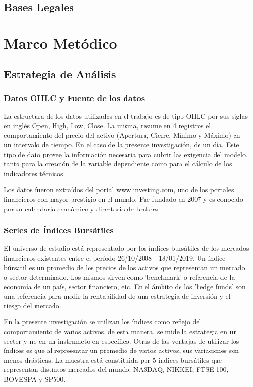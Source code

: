 \documentclass[a4paper,12pt]{Latex/Classes/PhDthesisPSnPDF}
\begin{document}
\section{Bases Legales}



\chapter{Marco Metódico}
\section{Estrategia de Análisis}

\subsection{Datos OHLC y Fuente de los datos}

La estructura de los datos utilizados en el trabajo es de tipo OHLC por sus siglas en inglés Open, High, Low, Close. La misma, resume en 4 registros el comportamiento del precio del activo (Apertura, Cierre, Mínimo y Máximo) en un intervalo de tiempo. En el caso de la presente investigación, de un día. Este tipo de dato provee la información necesaria para cubrir las exigencia del modelo, tanto para la creación de la variable dependiente como para el cálculo de los indicadores técnicos.

Los datos fueron extraídos del portal www.investing.com, uno de los portales financieros con mayor prestigio en el mundo. Fue fundado en 2007 y es conocido por su calendario económico y directorio de brokers.

\subsection{Series de Índices Bursátiles}

El universo de estudio está representado por los índices bursátiles de los mercados financieros existentes entre el período 26/10/2008 - 18/01/2019. Un índice búrsatil es un promedio de los precios de los activos que representan un mercado o sector determinado. Los mismos sirven como 'benchmark' o referencia de la economía de un país, sector financiero, etc. En el ámbito de los 'hedge funds' son una referencia para medir la rentabilidad de una estrategia de inversión y el riesgo del mercado.

En la presente investigación se utilizan los índices como reflejo del comportamiento de varios activos, de esta manera, se mide la estrategia en un sector y no en un instrumeto en específico. Otras de las ventajas de utilizar los índices es que al representar un promedio de varios activos, sus variaciones son menos drásticas. La muestra está constituida por 5 índices bursátiles que representan distintos mercados del mundo: NASDAQ, NIKKEI, FTSE 100, BOVESPA y SP500.
\end{document}
